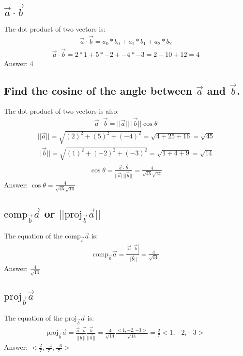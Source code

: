 \documentclass{article}
\begin{document}
\subsection{$\vec{a} \cdot \vec{b}$}
The dot product of two vectors is:
\begin{align*}
	\vec{a} \cdot \vec{b} = a_0 * b_0 + a_1 * b_1 + a_2 * b_2
\end{align*}
\begin{align*}
	\vec{a} \cdot \vec{b} = 2 * 1 + 5 * -2 + -4 * -3 = 2 -10 + 12 = 4
\end{align*}
Answer: 4
\subsection{Find the cosine of the angle between $\vec{a}$ and $\vec{b}$.}
The dot product of two vectors is also:
\begin{align*}
	\vec{a} \cdot \vec{b} = || \vec{a} || || \vec{b} || \cos{\theta}
\end{align*}
\begin{align*}
	|| \vec{a} || = \sqrt{(2)^2 + (5)^2 + (-4)^2} = \sqrt{4 + 25 + 16} = \sqrt{45}
\end{align*}
\begin{align*}
	|| \vec{b} || = \sqrt{(1)^2 + (-2)^2 + (-3)^2} = \sqrt{1 + 4 + 9} = \sqrt{14}
\end{align*}
\begin{align*}
	\cos{\theta} = \frac{\vec{a} \cdot \vec{b}}{|| \vec{a} || || \vec{b} ||} = \frac{4}{\sqrt{45} \sqrt{14}}
\end{align*}
Answer: $\cos{\theta} = \frac{4}{\sqrt{45}\sqrt{14}}$
\subsection{$\text{comp}_{\vec{b}} \vec{a}$ or $||\text{proj}_{\vec{b}} \vec{a} ||$}
The equation of the $\text{comp}_{\vec{b}} \vec{a}$ is:
\begin{align*}
	\text{comp}_{\vec{b}} \vec{a} = \frac{| \vec{a} \cdot \vec{b} |}{|| \vec{b} ||} = \frac{4}{\sqrt{14}}
\end{align*}
Answer: $\frac{4}{\sqrt{14}}$
\subsection{$\text{proj}_{\vec{b}} \vec{a}$}
The equation of the $\text{proj}_{\vec{b}} \vec{a}$ is:
\begin{align*}
	\text{proj}_{\vec{b}} \vec{a} = \frac{\vec{a} \cdot \vec{b}}{|| \vec{b} ||} \frac{\vec{b}}{|| \vec{b} ||} = \frac{4}{\sqrt{14}} \frac{<1, -2, -3>}{\sqrt{14}} = \frac{2}{7} <1, -2, -3>
\end{align*}
Answer: $<\frac{2}{7}, \frac{-4}{7}, \frac{-6}{7}>$
\end{document}
